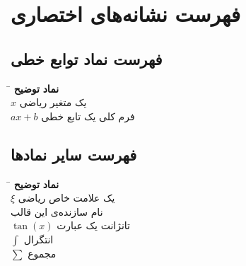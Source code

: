 \chapter*{فهرست نشانه‌های اختصاری}
\section*{فهرست نماد توابع خطی}
\begin{tabbing}[t]
\hspace{2cm} \= \hspace{5cm} \kill
\textbf{نماد} \> \textbf{توضیح} \\
$x$ \> یک متغیر ریاضی \\
$a x + b$ \>  فرم کلی یک تابع خطی 
\end{tabbing}

\section*{فهرست سایر نمادها}
\begin{tabbing}[t]
\hspace{2cm} \= \hspace{5cm} \kill
\textbf{نماد} \> \textbf{توضیح} \\
$\xi$ \> یک علامت خاص ریاضی \\
 \> نام سازنده‌ی این قالب \\
$\tan(x)$ \>  تانژانت یک عبارت \\
$\int$ \> انتگرال \\
$\sum$ \> مجموع
\end{tabbing}